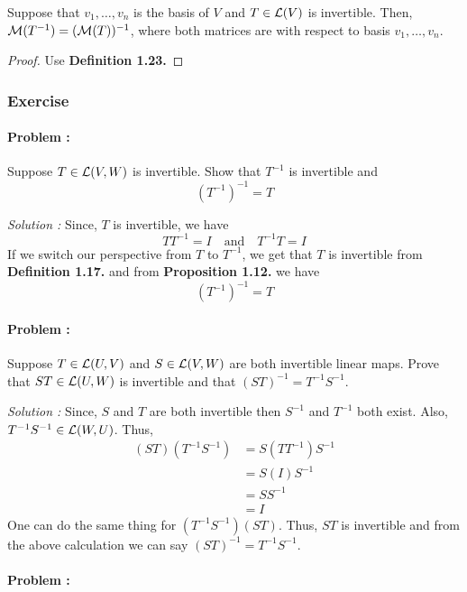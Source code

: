 \begin{proposition}
    Suppose that $v_1,\ldots,v_n$ is the basis of $V$ and $T \in \operatorname{\mathcal{L}}(V)$ is invertible. Then, 
    $\operatorname{\mathcal{M}}(T^{-1})=(\operatorname{\mathcal{M}}(T))^{-1}$, where both matrices are with respect to basis $v_1,\ldots,v_n$.
\end{proposition}


\begin{proof}
    Use \textbf{Definition 1.23.}
\end{proof}

\subsubsection{Exercise}


\paragraph{Problem :} Suppose $T \in \operatorname{\mathcal{L}}(V,W)$ is invertible. Show that $T^{-1}$ is invertible and 
\[ (T^{-1})^{-1}  = T \]

\vspace{4mm}
\textit{Solution :} Since, $T$ is invertible, we have 
\[ T T^{-1} = I \quad \text{and} \quad T^{-1} T = I \]
If we switch our perspective from $T$ to $T^{-1}$, we get that $T$ is invertible from \textbf{Definition 1.17.} and from 
\textbf{Proposition 1.12.} we have 
\[ (T^{-1})^{-1} = T \]

\paragraph{Problem :} Suppose $T \in \operatorname{\mathcal{L}}(U,V)$ and $S \in \operatorname{\mathcal{L}}(V,W)$ are both invertible linear maps. Prove that $ST \in \operatorname{\mathcal{L}}(U,W)$ is 
invertible and that $(ST)^{-1} = T^{-1} S^{-1}$.

\vspace{4mm}
\textit{Solution :} Since, $S$ and $T$ are both invertible then $S^{-1}$ and $T^{-1}$ both exist. Also, $T^{-1} S^{-1} \in \operatorname{\mathcal{L}}(W,U)$.
Thus,
\begin{align*}
    (ST)(T^{-1} S^{-1}) &= S(TT^{-1})S^{-1} \\
    &= S(I)S^{-1} \\
    &= SS^{-1} \\
    &= I
\end{align*}
One can do the same thing for $(T^{-1}S^{-1})(ST)$. Thus, $ST$ is invertible and from the above calculation we can say $(ST)^{-1}=T^{-1}S^{-1}$.

\paragraph{Problem :}
